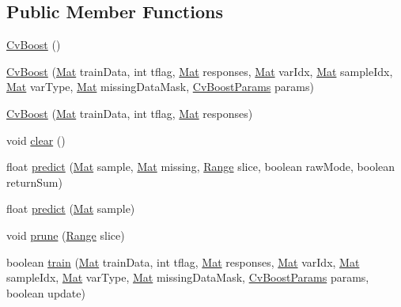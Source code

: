\subsection*{Public Member Functions}
\begin{DoxyCompactItemize}
\item 
\mbox{\hyperlink{classorg_1_1opencv_1_1ml_1_1_cv_boost_a7ccc8580af0866ddaaba2842dc1d5cb2}{Cv\+Boost}} ()
\item 
\mbox{\hyperlink{classorg_1_1opencv_1_1ml_1_1_cv_boost_a3e5a0bc801060bef92562e993ce2df83}{Cv\+Boost}} (\mbox{\hyperlink{classorg_1_1opencv_1_1core_1_1_mat}{Mat}} train\+Data, int tflag, \mbox{\hyperlink{classorg_1_1opencv_1_1core_1_1_mat}{Mat}} responses, \mbox{\hyperlink{classorg_1_1opencv_1_1core_1_1_mat}{Mat}} var\+Idx, \mbox{\hyperlink{classorg_1_1opencv_1_1core_1_1_mat}{Mat}} sample\+Idx, \mbox{\hyperlink{classorg_1_1opencv_1_1core_1_1_mat}{Mat}} var\+Type, \mbox{\hyperlink{classorg_1_1opencv_1_1core_1_1_mat}{Mat}} missing\+Data\+Mask, \mbox{\hyperlink{classorg_1_1opencv_1_1ml_1_1_cv_boost_params}{Cv\+Boost\+Params}} params)
\item 
\mbox{\hyperlink{classorg_1_1opencv_1_1ml_1_1_cv_boost_a2eda204881d5ea08dd747b9361d607a3}{Cv\+Boost}} (\mbox{\hyperlink{classorg_1_1opencv_1_1core_1_1_mat}{Mat}} train\+Data, int tflag, \mbox{\hyperlink{classorg_1_1opencv_1_1core_1_1_mat}{Mat}} responses)
\item 
void \mbox{\hyperlink{classorg_1_1opencv_1_1ml_1_1_cv_boost_ae689bc50fbe7f450720bab2bfa08f775}{clear}} ()
\item 
float \mbox{\hyperlink{classorg_1_1opencv_1_1ml_1_1_cv_boost_ae00e623e3bfb9cd65b15d4b785a3d7ee}{predict}} (\mbox{\hyperlink{classorg_1_1opencv_1_1core_1_1_mat}{Mat}} sample, \mbox{\hyperlink{classorg_1_1opencv_1_1core_1_1_mat}{Mat}} missing, \mbox{\hyperlink{classorg_1_1opencv_1_1core_1_1_range}{Range}} slice, boolean raw\+Mode, boolean return\+Sum)
\item 
float \mbox{\hyperlink{classorg_1_1opencv_1_1ml_1_1_cv_boost_aec5ee77e6c78a8ca7bea92e8c063d839}{predict}} (\mbox{\hyperlink{classorg_1_1opencv_1_1core_1_1_mat}{Mat}} sample)
\item 
void \mbox{\hyperlink{classorg_1_1opencv_1_1ml_1_1_cv_boost_ade20760514ef7ea629c4985369453f4e}{prune}} (\mbox{\hyperlink{classorg_1_1opencv_1_1core_1_1_range}{Range}} slice)
\item 
boolean \mbox{\hyperlink{classorg_1_1opencv_1_1ml_1_1_cv_boost_acedbe8d37fcbe7789132b0e8b65e6d38}{train}} (\mbox{\hyperlink{classorg_1_1opencv_1_1core_1_1_mat}{Mat}} train\+Data, int tflag, \mbox{\hyperlink{classorg_1_1opencv_1_1core_1_1_mat}{Mat}} responses, \mbox{\hyperlink{classorg_1_1opencv_1_1core_1_1_mat}{Mat}} var\+Idx, \mbox{\hyperlink{classorg_1_1opencv_1_1core_1_1_mat}{Mat}} sample\+Idx, \mbox{\hyperlink{classorg_1_1opencv_1_1core_1_1_mat}{Mat}} var\+Type, \mbox{\hyperlink{classorg_1_1opencv_1_1core_1_1_mat}{Mat}} missing\+Data\+Mask, \mbox{\hyperlink{classorg_1_1opencv_1_1ml_1_1_cv_boost_params}{Cv\+Boost\+Params}} params, boolean update)

\end{DoxyCompactItemize}

